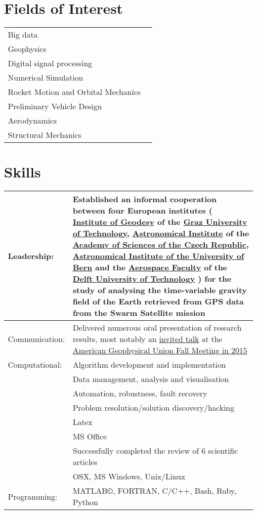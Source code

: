\documentclass[a4paper]{article}
\newcommand{\procv}[2]{\iftoggle{professionalcv}{#1}{#2}}
\newenvironment{cvsection}[2]{
  \vspace{0.2in}
  \section*{#1}
  \vspace{-0.2in}
  \def\arraystretch{1.33}
  \begin{longtable}{lp{#2}}
}{
  \end{longtable}
}
\begin{document}
\begin{cvsection}{Fields of Interest}{10cm}
 Big data & \\
 Geophysics & \\
 Digital signal processing & \\
 Numerical Simulation & \\
 Rocket Motion and Orbital Mechanics & \\
 Preliminary Vehicle Design & \\
 Aerodynamics & \\
 Structural Mechanics & \\
\end{cvsection}


\begin{cvsection}{Skills}{11.2cm}
Leadership: & Established an informal cooperation between four European institutes (%
\href{http://www.itsg.tugraz.at}{Institute of Geodesy} of the \href{http://www.tugraz.at}{Graz University of Technology},
\href{http://www.asu.cas.cz/en}{Astronomical Institute} of the \href{http://www.cas.cz/index.html}{Academy of Sciences of the Czech Republic},
\href{http://www.aiub.unibe.ch}{Astronomical Institute of the University of Bern} and the
\href{http://www.lr.tudelft.nl}{Aerospace Faculty} of the \href{http://www.tudelft.nl}{Delft University of Technology}%
) for the study of analysing the time-variable gravity field of the Earth retrieved from GPS data from the Swarm Satellite mission\\
\hline
Communication:  & Delivered numerous oral presentation of research results, most notably an \href{http://agu.confex.com/agu/fm15/meetingapp.cgi/Paper/71877}{invited talk} at the \href{http://fallmeeting.agu.org/2015/}{American Geophysical Union Fall Meeting in 2015}\\
\hline
Computational:  & Algorithm development and implementation\\
                & Data management, analysis and visualisation\\
                & Automation, robustness, fault recovery\\
                & Problem resolution\slash solution discovery\slash hacking\\
\hline
\procv{
Software: & Latex \\
          & MS Office \\
}{
Articles review: & Successfully completed the review of 6 scientific articles\\
}
\hline
Operating Systems: & OSX, MS Windows, Unix/Linux \\
\hline
Programming:  & MATLAB\copyright, FORTRAN, C/C++, Bash, Ruby, Python \\
\end{cvsection}
\end{document}
